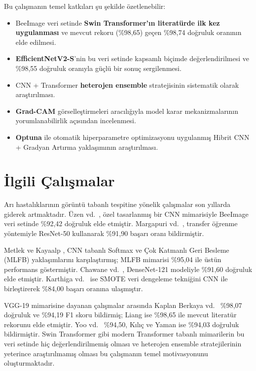 \documentclass[conference]{IEEEtran}
\begin{document}
Bu çalışmanın temel katkıları şu şekilde özetlenebilir:

\begin{itemize}
    \item BeeImage veri setinde \textbf{Swin Transformer'ın literatürde ilk kez uygulanması} ve mevcut rekoru (\%98,65) geçen \%98,74 doğruluk oranının elde edilmesi.
    \item \textbf{EfficientNetV2-S}'nin bu veri setinde kapsamlı biçimde değerlendirilmesi ve \%98,55 doğruluk oranıyla güçlü bir sonuç sergilenmesi.
    \item CNN + Transformer \textbf{heterojen ensemble} stratejisinin sistematik olarak araştırılması.
    \item \textbf{Grad-CAM} görselleştirmeleri aracılığıyla model karar mekanizmalarının yorumlanabilirlik açısından incelenmesi.
    \item \textbf{Optuna} ile otomatik hiperparametre optimizasyonu uygulanmış Hibrit CNN + Gradyan Artırma yaklaşımının araştırılması.
\end{itemize}

\section{İlgili Çalışmalar}

Arı hastalıklarının görüntü tabanlı tespitine yönelik çalışmalar son yıllarda giderek artmaktadır. Üzen vd.\ \cite{uzen2019}, özel tasarlanmış bir CNN mimarisiyle BeeImage veri setinde \%92,42 doğruluk elde etmiştir. Margapuri vd.\ \cite{margapuri2020}, transfer öğrenme yöntemiyle ResNet-50 kullanarak \%91,90 başarı oranı bildirmiştir.

Metlek ve Kayaalp \cite{metlek2021}, CNN tabanlı Softmax ve Çok Katmanlı Geri Besleme (MLFB) yaklaşımlarını karşılaştırmış; MLFB mimarisi \%95,04 ile üstün performans göstermiştir. Chawane vd.\ \cite{chawane2022}, DenseNet-121 modeliyle \%91,60 doğruluk elde etmiştir. Karthiga vd.\ \cite{karthiga2021} ise SMOTE veri dengeleme tekniğini CNN ile birleştirerek \%84,00 başarı oranına ulaşmıştır.

VGG-19 mimarisine dayanan çalışmalar arasında Kaplan Berkaya vd.\ \cite{kaplan2021} \%98,07 doğruluk ve \%94,19 F1 skoru bildirmiş; Liang \cite{liang2022} ise \%98,65 ile mevcut literatür rekorunu elde etmiştir. Yoo vd.\ \cite{yoo2023} \%94,50, Kılıç ve Yaman \cite{kilic2024} ise \%94,03 doğruluk bildirmiştir. Swin Transformer gibi modern Transformer tabanlı mimarilerin bu veri setinde hiç değerlendirilmemiş olması ve heterojen ensemble stratejilerinin yeterince araştırılmamış olması bu çalışmanın temel motivasyonunu oluşturmaktadır.
\end{document}
